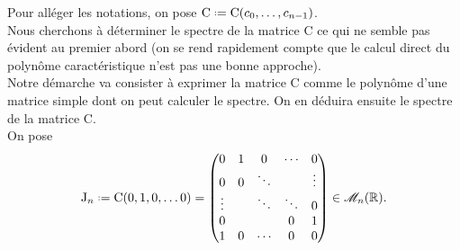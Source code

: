\begin{preuve}
    Pour alléger les notations, on pose $\mathrm{C} \defeq \mathrm{C}(c_0, \dots, c_{n-1})$. \\
    Nous cherchons à déterminer le spectre de la matrice $\mathrm{C}$ ce qui ne semble pas évident au premier abord (on se rend rapidement compte que le calcul direct du polynôme caractéristique n'est pas une bonne approche). \\
    Notre démarche va consister à exprimer la matrice $\mathrm{C}$ comme le polynôme d'une matrice simple dont on peut calculer le spectre. On en déduira ensuite le spectre de la matrice $\mathrm{C}$. \\
    On pose 
    $$
    \mathrm{J}_n \defeq \mathrm{C}(0, 1, 0, \dots 0) = 
    \begin{pmatrix}
    0 & 1 & 0 & \cdots & 0 \\
    0 & 0 & \ddots & & \vdots \\
    \vdots & & \ddots & \ddots & 0 \\
    0 & & & 0 & 1 \\
    1 & 0 & \cdots & 0 & 0
    \end{pmatrix} \in \M_n(\R).
    $$
    

\end{preuve}
